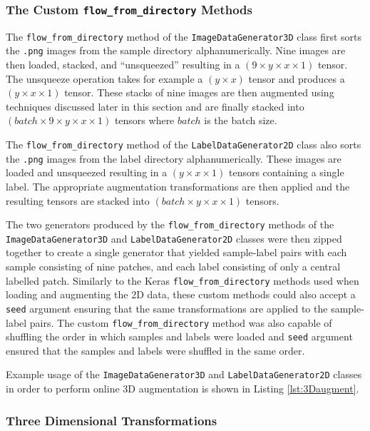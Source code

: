 \subsubsection{The Custom \texttt{flow\_from\_directory} Methods}

The \texttt{flow\_from\_directory} method of the \texttt{ImageDataGenerator3D} class first sorts the \texttt{.png} images from the sample directory alphanumerically. Nine images are then loaded, stacked, and ``unsqueezed'' resulting in a $(9 \times y \times x \times 1)$ tensor. The unsqueeze operation takes for example a $(y \times x)$ tensor and produces a $(y \times x \times 1)$ tensor. These stacks of nine images are then augmented using techniques discussed later in this section and are finally stacked into $(batch \times 9 \times y \times x \times 1)$ tensors where $batch$ is the batch size.

The \texttt{flow\_from\_directory} method of the \texttt{LabelDataGenerator2D} class also sorts the \texttt{.png} images from the label directory alphanumerically. These images are loaded and unsqueezed resulting in a $(y \times x \times 1)$ tensors containing a single label. The appropriate augmentation transformations are then applied and the resulting tensors are stacked into $(batch \times y \times x \times 1)$ tensors.

The two generators produced by the \texttt{flow\_from\_directory} methods of the \texttt{ImageDataGenerator3D} and \texttt{LabelDataGenerator2D} classes were then zipped together to create a single generator that yielded sample-label pairs with each sample consisting of nine patches, and each label consisting of only a central labelled patch. Similarly to the Keras \texttt{flow\_from\_directory} methods used when loading and augmenting the 2D data, these custom methods could also accept a \texttt{seed} argument ensuring that the same transformations are applied to the sample-label pairs. The custom \texttt{flow\_from\_directory} method was also capable of shuffling the order in which samples and labels were loaded and \texttt{seed} argument ensured that the samples and labels were shuffled in the same order.

Example usage of the \texttt{ImageDataGenerator3D} and \texttt{LabelDataGenerator2D} classes in order to perform online 3D augmentation is shown in Listing \ref{lst:3Daugment}.

\subsubsection{Three Dimensional Transformations}
\label{sec:3daug}

